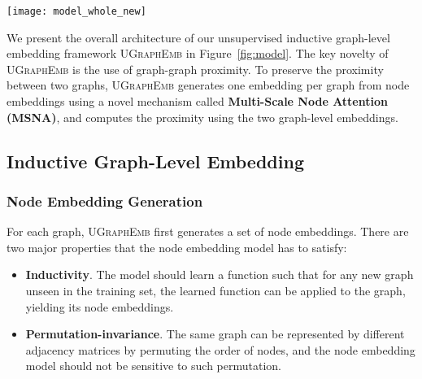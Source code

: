 \documentclass{article}
\newcommand{\model}{\textsc{UGraphEmb}\xspace}
\begin{document}
\begin{figure*}
\centering
\texttt{[image: model\_whole\_new]}
\vspace*{-2mm}
\caption{Overview of \model. (a) Given a set of graphs, (b) \model first computes the graph-graph proximity scores (normalized distance scores in this example), (c) yielding a ``hyper-level graph'' where each node is a graph in the dataset, and each edge has a proximity score associated with it, representing its weight/strength. \model then trains a function that maps each graph into an embedding which preserves the proximity score. The bottom flow illustrates the details of graph-level embedding generation. (d) After embeddings are generated, similarity ranking can be performed. The green ``+'' sign denotes the embedding of an example query graph. Colors of dots indicate how similar a graph is to the query based on the ground truth (from red to blue, meaning from the most similar to the least similar). (e) Finally, \model can perform fine-tuning on the proximity-preserving graph-level embeddings, adjusting them for the task of graph classification. Different colors represent different graph labels in the classification task. 
}
\label{fig:model}
\vspace*{-3mm}
\end{figure*}



We present the overall architecture of our unsupervised inductive graph-level embedding framework \model in Figure~\ref{fig:model}. The key novelty of \model is the use of graph-graph proximity. To preserve the proximity between two graphs, \model generates one embedding per graph from node embeddings using a novel mechanism called \textbf{Multi-Scale Node Attention (MSNA)}, and computes the proximity using the two graph-level embeddings. 


\subsection{Inductive Graph-Level Embedding}


\subsubsection{Node Embedding Generation}


For each graph, \model first generates a set of node embeddings. There are two major properties that the node embedding model has to satisfy:
\begin{itemize}
    \item \textbf{{Inductivity}}.
    The model should learn a function such that for any new graph unseen in the training set, the learned function can be applied to the graph, yielding its node embeddings.
    \item \textbf{{Permutation-invariance}}.
    The same graph can be represented by different adjacency matrices by permuting the order of nodes, and the node embedding model should not be sensitive to such permutation.
\end{itemize}
\end{document}
